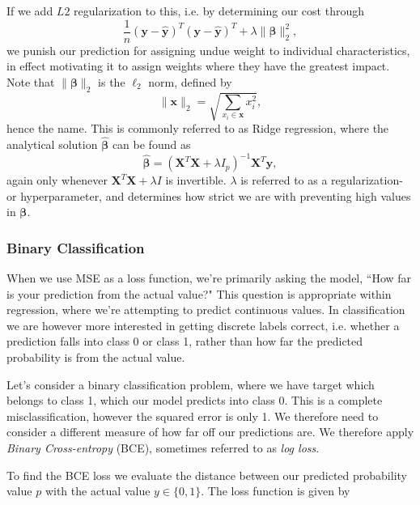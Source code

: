 \documentclass{article}
\theoremstyle{definition}
\begin{document}
If we add $L2$ regularization to this, i.e. by determining our cost through
\begin{equation*}
    \frac{1}{n} \left( \boldsymbol{y} - \hat{\boldsymbol{y}} \right)^T \left( \boldsymbol{y} - \hat{\boldsymbol{y}} \right)^T + \lambda \lVert \boldsymbol{\beta} \rVert_2^2,
\end{equation*}
we punish our prediction for assigning undue weight to individual characteristics, in effect motivating it to assign weights where they have the greatest impact. Note that $\lVert \boldsymbol{\beta} \rVert_2$ is the $\ell_2$ norm, defined by
\begin{equation*}
    \lVert \boldsymbol{x} \rVert_2 = \sqrt{\sum_{x_i \in \boldsymbol{x}} x_i^2},
\end{equation*}
hence the name. This is commonly referred to as Ridge regression, where the analytical solution $\hat{\boldsymbol{\beta}}$ can be found as
\begin{equation*}
    \hat{\boldsymbol{\beta}} = \left( \mathbf{X}^T \mathbf{X} + \lambda I_{p} \right)^{-1} \mathbf{X}^T \boldsymbol{y},
\end{equation*}
again only whenever $\mathbf{X}^T \mathbf{X} + \lambda I$ is invertible. $\lambda$ is referred to as a regularization- or hyperparameter, and determines how strict we are with preventing high values in $\boldsymbol{\beta}$.

\subsubsection{Binary Classification}
When we use MSE as a loss function, we're primarily asking the model, ``How far is your prediction from the actual value?" This question is appropriate within regression, where we're attempting to predict continuous values. In classification we are however more interested in getting discrete labels correct, i.e. whether a prediction falls into class 0 or class 1, rather than how far the predicted probability is from the actual value.

Let's consider a binary classification problem, where we have target which belongs to class 1, which our model predicts into class 0. This is a complete misclassification, however the squared error is only 1. We therefore need to consider a different measure of how far off our predictions are. We therefore apply \textit{Binary Cross-entropy} (BCE), sometimes referred to as \textit{log loss}.

To find the BCE loss we evaluate the distance between our predicted probability value $p$ with the actual value $y \in \{0, 1\}$. The loss function is given by
\end{document}
